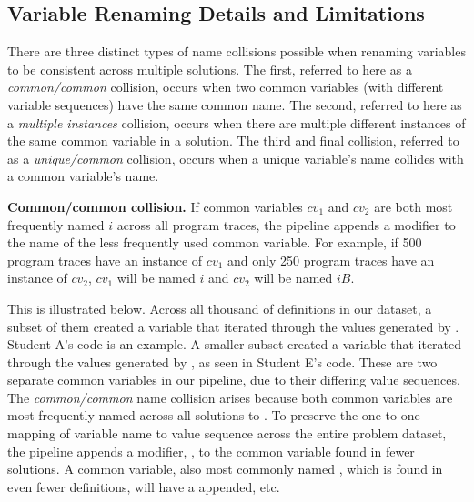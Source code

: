 \subsection{Variable Renaming Details and Limitations} \label{repercussions}

There are three distinct types of name collisions possible when renaming variables to be consistent across multiple solutions. The first, referred to here as a {\it common/common} collision, occurs when two common variables (with different variable sequences) have the same common name. The second, referred to here as a {\it multiple instances} collision, occurs when there are multiple different instances of the same common variable in a solution. The third and final collision, referred to as a {\it unique/common} collision, occurs when a unique variable's name collides with a common variable's name.

{\bf Common/common collision.} If common variables $cv_{1}$ and $cv_{2}$ are both most frequently named $i$ across all program traces, the pipeline appends a modifier to the name of the less frequently used common variable. For example, if 500 program traces have an instance of $cv_{1}$ and only 250 program traces have an instance of $cv_{2}$, $cv_{1}$ will be named $i$ and $cv_{2}$ will be named $iB$. 

This is illustrated below. Across all thousand of  definitions in our dataset, a subset of them created a variable that iterated through the values generated by . Student A's code is an example. A smaller subset created a variable that iterated through the values generated by , as seen in Student E's code. These are two separate common variables in our pipeline, due to their differing value sequences. The {\it common/common} name collision arises because both common variables are most frequently named  across all solutions to . To preserve the one-to-one mapping of variable name to value sequence across the entire  problem dataset, the pipeline appends a modifier, , to the common variable  found in fewer  solutions. A common variable, also most commonly named , which is found in even fewer  definitions, will have a  appended, etc.

